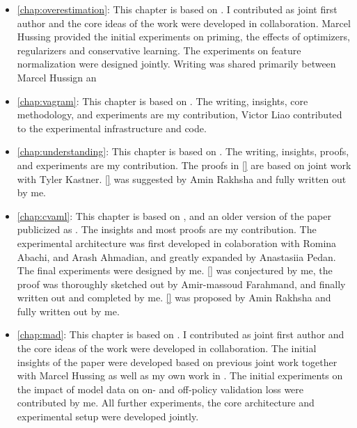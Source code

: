 \begin{itemize}
    \item \autoref{chap:overestimation}: This chapter is based on . I contributed as joint first author and the core ideas of the work were developed in collaboration. Marcel Hussing provided the initial experiments on priming, the effects of optimizers, regularizers and conservative learning. The experiments on feature normalization were designed jointly. Writing was shared primarily between Marcel Hussign an
    \item \autoref{chap:vagram}: This chapter is based on . The writing, insights, core methodology, and experiments are my contribution, Victor Liao contributed to the experimental infrastructure and code.
    \item \autoref{chap:understanding}: This chapter is based on . The writing, insights, proofs, and experiments are my contribution. The proofs in \autoref{} are based on joint work with Tyler Kastner. \autoref{} was suggested by Amin Rakhsha and fully written out by me.
    \item \autoref{chap:cvaml}: This chapter is based on , and an older version of the paper publicized as . The insights and most proofs are my contribution. The experimental architecture was first developed in colaboration with Romina Abachi, and Arash Ahmadian, and greatly expanded by Anastasiia Pedan. The final experiments were designed by me. \autoref{} was conjectured by me, the proof was thoroughly sketched out by Amir-massoud Farahmand, and finally written out and completed by me. \autoref{} was proposed by Amin Rakhsha and fully written out by me.
    \item \autoref{chap:mad}: This chapter is based on . I contributed as joint first author and the core ideas of the work were developed in collaboration. The initial insights of the paper were developed based on previous joint work \cite{hussing2024dissecting} together with Marcel Hussing as well as my own work in \textcite{voelcker2023lambda}. The initial experiments on the impact of model data on on- and off-policy validation loss were contributed by me. All further experiments, the core architecture and experimental setup were developed jointly.
\end{itemize}

